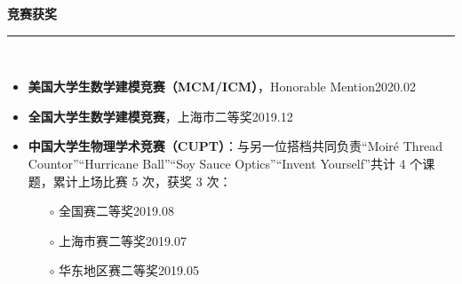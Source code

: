 \documentclass[letterpaper,11pt]{article}
\begin{document}
{\Large\bfseries{}竞赛获奖}\\
\rule[1.5ex]{\columnwidth}{1pt}\\
\vspace{-4ex}
\begin{itemize}
    \item {\songti\large\bfseries{}美国大学生数学建模竞赛（MCM/ICM）}，{\large{}Honorable Mention}\hfill{2020.02}
    \item {\songti\large\bfseries{}全国大学生数学建模竞赛}，{\large{}上海市二等奖}\hfill{2019.12}
    \item {\songti\large\bfseries{}中国大学生物理学术竞赛（CUPT）}：与另一位搭档共同负责“Moiré Thread Countor”“Hurricane Ball”“Soy Sauce Optics”“Invent Yourself”共计 4 个课题，累计上场比赛 5 次，获奖 3 次：
    \begin{itemize}
        \item[$\circ$] {\large{}全国赛二等奖}\hfill{2019.08}
        \item[$\circ$] {\large{}上海市赛二等奖}\hfill{2019.07}
        \item[$\circ$] {\large{}华东地区赛二等奖}\hfill{2019.05}
    \end{itemize}
\end{itemize}
\vspace{1ex}
\end{document}
